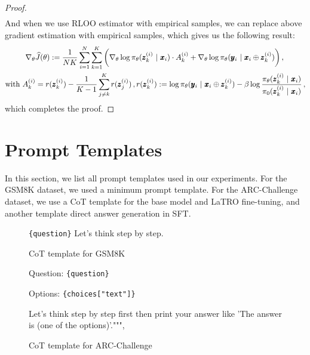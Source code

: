 \begin{proof}
\begin{align*}
\end{align*}
And when we use RLOO estimator with empirical samples, we can replace above gradient estimation with empirical samples, which gives us the following result:
\begin{align*}
       &~~~~~~~~\nabla_{\theta} \widehat{J}(\theta) := \frac{1}{NK}\sum_{i=1}^{N}\sum_{k=1}^{K}\bigg( \nabla_\theta \log \pi_{\theta}(\pmb{z}_k^{(i)} ~|~ \pmb{x}_i)\cdot A_k^{(i)} + \nabla_\theta \log \pi_\theta (\pmb{y}_i ~|~ \pmb{x}_i \oplus \pmb{z}_k^{(i)} )  \bigg)\,, \\
       &\text{with} ~A_k^{(i)} = r(\pmb{z}_k^{(i)}) - \frac{1}{K-1}\sum_{j \neq k}^{K} r(\pmb{z}_j^{(i)})\,, r(\pmb{z}_k^{(i)}) := \log \pi_\theta(\pmb{y}_i~|~\pmb{x}_i \oplus \pmb{z}_{k}^{(i)}) - \beta \log \frac{\pi_{\theta}(\pmb{z}_k^{(i)} ~|~\pmb{x}_i)}{\pi_{0}(\pmb{z}_k^{(i)}  ~|~\pmb{x}_i)} \,,
    \end{align*}
which completes the proof.
\end{proof}

\section{Prompt Templates}
\label{sec:templates}
In this section, we list all prompt templates used in our experiments. For the GSM8K dataset, we used a minimum prompt template. For the ARC-Challenge dataset, we use a CoT template for the base model and LaTRO fine-tuning, and another template direct answer generation in SFT.
\begin{figure}[ht]
    \centering
    \begin{bluetextbox}
    \texttt{\{question\}} Let's think step by step.
    \end{bluetextbox}
    \caption{CoT template for GSM8K}
    \label{fig:gsm8k_template}
\end{figure}

\begin{figure}[ht]
    \centering
    \begin{bluetextbox}
        Question: \texttt{\{question\}}
        
        Options: \texttt{\{choices["text"]\}}
        
        Let's think step by step first then print your answer like 'The answer is (one of the options)'.""",
    \end{bluetextbox}
    \caption{CoT template for ARC-Challenge}
    \label{fig:template_arc_cot}
\end{figure}

